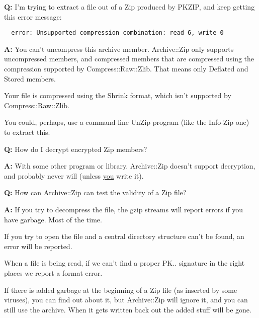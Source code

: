 \documentclass[]{article}
\let\realtextbf=\textbf
\renewcommand{\textbf}[1]{\textcolor{boldcolor}{\realtextbf{#1}}}
\renewcommand{\emph}[1]{\underline{#1}}
\begin{document}
\textbf{Q:} I'm trying to extract a file out of a Zip produced by PKZIP,
and keep getting this error message:

\begin{verbatim}
  error: Unsupported compression combination: read 6, write 0
\end{verbatim}

\textbf{A:} You can't uncompress this archive member. Archive::Zip only
supports uncompressed members, and compressed members that are
compressed using the compression supported by Compress::Raw::Zlib. That
means only Deflated and Stored members.

Your file is compressed using the Shrink format, which isn't supported
by Compress::Raw::Zlib.

You could, perhaps, use a command-line UnZip program (like the Info-Zip
one) to extract this.


\textbf{Q:} How do I decrypt encrypted Zip members?

\textbf{A:} With some other program or library. Archive::Zip doesn't
support decryption, and probably never will (unless \emph{you} write
it).


\textbf{Q:} How can Archive::Zip can test the validity of a Zip file?

\textbf{A:} If you try to decompress the file, the gzip streams will
report errors if you have garbage. Most of the time.

If you try to open the file and a central directory structure can't be
found, an error will be reported.

When a file is being read, if we can't find a proper PK.. signature in
the right places we report a format error.

If there is added garbage at the beginning of a Zip file (as inserted by
some viruses), you can find out about it, but Archive::Zip will ignore
it, and you can still use the archive. When it gets written back out the
added stuff will be gone.
\end{document}
